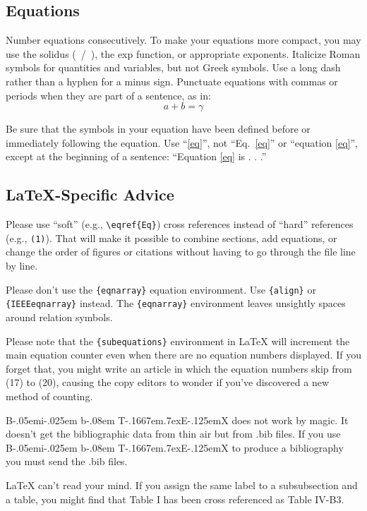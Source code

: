 \documentclass[conference, tikz]{IEEEtran}
\def\BibTeX{{\rm B\kern-.05em{\sc i\kern-.025em b}\kern-.08em
    T\kern-.1667em\lower.7ex\hbox{E}\kern-.125emX}}
\begin{document}
\subsection{Equations}
Number equations consecutively. To make your 
\cite{handout}
equations more compact, you may use the solidus (~/~), the exp function, or 
appropriate exponents. Italicize Roman symbols for quantities and variables, 
but not Greek symbols. Use a long dash rather than a hyphen for a minus 
sign. Punctuate equations with commas or periods when they are part of a 
sentence, as in:
\begin{equation}
a+b=\gamma\label{eq}
\end{equation}

Be sure that the 
symbols in your equation have been defined before or immediately following 
the equation. Use ``\eqref{eq}'', not ``Eq.~\eqref{eq}'' or ``equation \eqref{eq}'', except at 
the beginning of a sentence: ``Equation \eqref{eq} is . . .''

\subsection{\LaTeX-Specific Advice}

Please use ``soft'' (e.g., \verb|\eqref{Eq}|) cross references instead
of ``hard'' references (e.g., \verb|(1)|). That will make it possible
to combine sections, add equations, or change the order of figures or
citations without having to go through the file line by line.

Please don't use the \verb|{eqnarray}| equation environment. Use
\verb|{align}| or \verb|{IEEEeqnarray}| instead. The \verb|{eqnarray}|
environment leaves unsightly spaces around relation symbols.

Please note that the \verb|{subequations}| environment in {\LaTeX}
will increment the main equation counter even when there are no
equation numbers displayed. If you forget that, you might write an
article in which the equation numbers skip from (17) to (20), causing
the copy editors to wonder if you've discovered a new method of
counting.

{\BibTeX} does not work by magic. It doesn't get the bibliographic
data from thin air but from .bib files. If you use {\BibTeX} to produce a
bibliography you must send the .bib files. 

{\LaTeX} can't read your mind. If you assign the same label to a
subsubsection and a table, you might find that Table I has been cross
referenced as Table IV-B3. 
\end{document}
